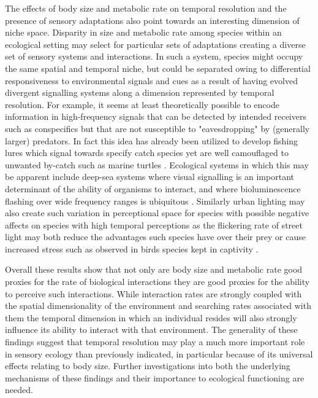 The effects of body size and metabolic rate on temporal resolution and the presence of sensory adaptations also point towards an interesting dimension of niche space. Disparity in size and metabolic rate among species within an ecological setting may select for particular sets of adaptations creating a diverse set of sensory systems and interactions. In such a system, species might occupy the same spatial and temporal niche, but could be separated owing to differential responsiveness to environmental signals and cues as a result of having evolved divergent signalling systems along a dimension represented by temporal resolution. For example, it seems at least theoretically possible to encode information in high-frequency signals that can be detected by intended receivers such as conspecifics but that are not susceptible to "eavesdropping" by (generally larger) predators. In fact this idea has already been utilized to develop fishing lures which signal towards specify catch species yet are well camouflaged to unwanted by-catch such as marine turtles \citep{jordan2013linking,crognale2008leatherback}. Ecological systems in which this may be apparent include deep-sea systems where visual signalling is an important determinant of the ability of organisms to interact, and where bioluminescence flashing over wide frequency ranges is ubiquitous \citep{haddock2005bioluminescent,widder2010bioluminescence}. Similarly urban lighting may also create such variation in perceptional space for species with possible negative affects on species with high temporal perceptions as the flickering rate of street light may both reduce the advantages such species have over their prey or cause increased stress such as observed in birds species kept in captivity \citep{inger2014potential}. 


Overall these results show that not only are body size and metabolic rate good proxies for the rate of biological interactions they are good proxies for the ability to perceive such interactions. While interaction rates are strongly coupled with the spatial dimensionality of the environment and searching rates associated with them \citep{pawar2012dimensionality} the temporal dimension in which an individual resides will also strongly influence its ability to interact with that environment. The generality of these findings suggest that temporal resolution may play a much more important role in sensory ecology than previously indicated, in particular because of its universal effects relating to body size. Further investigations into both the underlying mechanisms of these findings and their importance to ecological functioning are needed.


%
%


